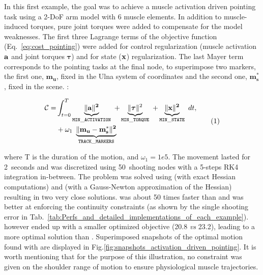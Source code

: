 In this first example, the goal was to achieve a muscle activation driven pointing task using a 2-DoF arm model with 6 muscle elements. 
In addition to muscle-induced torques, pure joint torques were added to compensate for the model weaknesses.
The first three Lagrange terms of the objective function (Eq.~\ref{eq:cost_pointing}) were added for control regularization (muscle activation $\bf{a}$ and joint torques $\boldsymbol{\tau}$) and for state ($\bf{x}$) regularization.
The last Mayer term corresponds to the pointing tasks at the final node, to superimpose two markers, the first one, $\mathbf{m_u}$, fixed in the Ulna system of coordinates and the second one, $\mathbf{m^*_s}$, fixed in the scene.
:

\[
\begin{aligned}
	\mathcal{C} = &\int_{t=0}^T\underbrace{\|\bf{a}\|^2}_{\mathtt{MIN\_ACTIVATION}}~
	+\underbrace{\|\boldsymbol\tau\|^2}_{\mathtt{MIN\_TORQUE}}~
	+\underbrace{\|\bf{x}\|^2}_{\mathtt{MIN\_STATE}}~ dt,\\
	&+ \omega_1~\underbrace{\|\bf m_u-\bf m^*_s\|^2}_{\mathtt{TRACK\_MARKERS}}~
\end{aligned}
\addtag
\label{eq:cost_pointing}
\]
%

\noindent where T is the duration of the motion, and $\omega_1=1e5$.
The movement lasted for 2~seconds and was discretized using 50~shooting nodes with a 5-steps RK4 integration in-between.
The problem was solved using \ipopt (with exact Hessian computations) and \acados (with a Gauss-Newton approximation of the Hessian) resulting in two very close solutions.
\acados was about 50 times faster than \ipopt and was better at enforcing the continuity constraints (as shown by the single shooting error in Tab.~\ref{tab:Perfs_and_detailed_implementations_of_each_example}).
\ipopt however ended up with a smaller optimized objective (20.8 \textit{vs} 23.2), leading to a more optimal solution than \acados. 
Superimposed snapshots of the optimal motion found with \acados are displayed in Fig.\ref{fig:snapshots_activation_driven_pointing}.
It is worth mentioning that for the purpose of this illustration, no constraint was given on the shoulder range of motion to ensure physiological muscle trajectories. 

